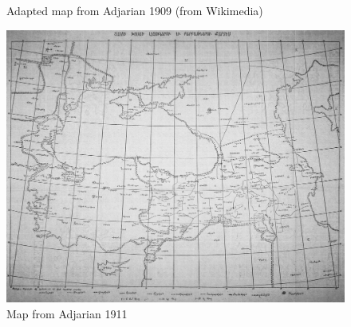 \begin{figure} 
	\caption{Adapted map from Adjarian 1909 (from Wikimedia)}
	\label{map:Adjarian1909color}
\end{figure}


\begin{landscape}
	\begin{figure} 
		\caption{Map from Adjarian 1911}
	\label{map:Adjarian1911}
	
		\centering
		\includegraphics[height=1\textheight]{images/map1911.png}
	
	\end{figure}
\end{landscape}










